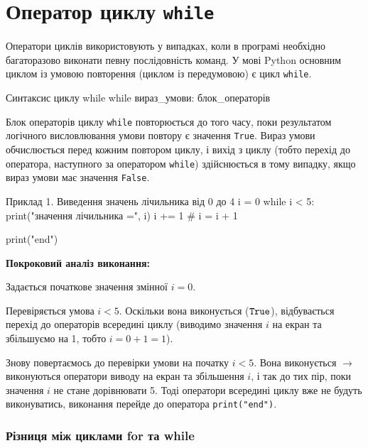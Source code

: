 \chapter{Оператор циклу \texttt{while}}

Оператори циклів використовують у випадках, коли в програмі необхідно багаторазово виконати певну послідовність команд. У мові Python основним циклом із умовою повторення (циклом із передумовою) є цикл \texttt{while}.

\vspace{0.3cm}

\begin{pydef}
Синтаксис циклу while
while вираз_умови:
    блок_операторів
\end{pydef}

\vspace{0.3cm}

Блок операторів циклу \texttt{while} повторюється до того часу, поки результатом логічного висловлювання умови повтору є значення \texttt{True}. Вираз умови обчислюється перед кожним повтором циклу, і вихід з циклу (тобто перехід до оператора, наступного за оператором \texttt{while}) здійснюється в тому випадку, якщо вираз умови має значення \texttt{False}.

\begin{py}{Приклад 1. Виведення значень лічильника від 0 до 4}
i = 0
while i < 5:
    print("значення лічильника =", i)
    i += 1  # i = i + 1

print("end")
\end{py}

\noindent\textbf{Покроковий аналіз виконання:}

Задається початкове значення змінної $i = 0$.

 Перевіряється умова $i < 5$. Оскільки вона виконується ($\text{\texttt{True}}$), відбувається перехід до операторів всередині циклу (виводимо значення $i$ на екран та збільшуємо на 1, тобто $i = 0 + 1 = 1$). 
 
 Знову повертаємось до перевірки умови на початку $i < 5$. Вона виконується $\rightarrow$ виконуються оператори виводу на екран та збільшення $i$, і так до тих пір, поки значення $i$ не стане дорівнювати 5. Тоді оператори всередині циклу вже не будуть виконуватись, виконання перейде до оператора \texttt{print("end")}.
 \subsection*{Різниця між циклами for та while}
 
